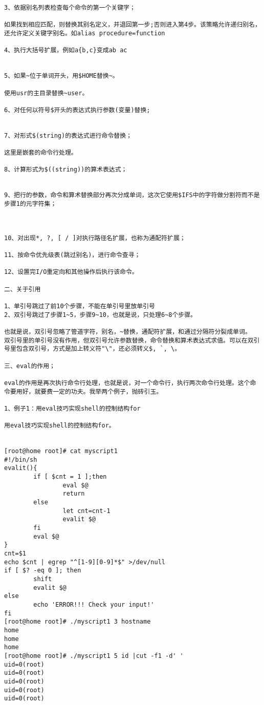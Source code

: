 \begin{lstlisting}
3、依据别名列表检查每个命令的第一个关键字；

如果找到相应匹配，则替换其别名定义，并退回第一步;否则进入第4步。该策略允许递归别名，还允许定义关键字别名。如alias procedure=function

4、执行大括号扩展，例如a{b,c}变成ab ac


5、如果~位于单词开头，用$HOME替换~。

使用usr的主目录替换~user。

6、对任何以符号$开头的表达式执行参数(变量)替换;


7、对形式$(string)的表达式进行命令替换；

这里是嵌套的命令行处理。

8、计算形式为$((string))的算术表达式；


9、把行的参数，命令和算术替换部分再次分成单词，这次它使用$IFS中的字符做分割符而不是步骤1的元字符集；

 

10、对出现*, ?, [ / ]对执行路径名扩展，也称为通配符扩展；

11、按命令优先级表(跳过别名)，进行命令查寻；

12、设置完I/O重定向和其他操作后执行该命令。

二、关于引用

1、单引号跳过了前10个步骤，不能在单引号里放单引号
2、双引号跳过了步骤1~5，步骤9~10，也就是说，只处理6~8个步骤。

也就是说，双引号忽略了管道字符，别名，~替换，通配符扩展，和通过分隔符分裂成单词。
双引号里的单引号没有作用，但双引号允许参数替换，命令替换和算术表达式求值。可以在双引号里包含双引号，方式是加上转义符"\"，还必须转义$, `, \。

三、eval的作用；

eval的作用是再次执行命令行处理，也就是说，对一个命令行，执行两次命令行处理。这个命令要用好，就要费一定的功夫。我举两个例子，抛砖引玉。

1、例子1：用eval技巧实现shell的控制结构for

用eval技巧实现shell的控制结构for。

 
[root@home root]# cat myscript1
#!/bin/sh
evalit(){
        if [ $cnt = 1 ];then
                eval $@
                return
        else
                let cnt=cnt-1
                evalit $@
        fi
        eval $@
}
cnt=$1
echo $cnt | egrep "^[1-9][0-9]*$" >/dev/null
if [ $? -eq 0 ]; then
        shift
        evalit $@
else
        echo 'ERROR!!! Check your input!'
fi
[root@home root]# ./myscript1 3 hostname
home
home
home
[root@home root]# ./myscript1 5 id |cut -f1 -d' '
uid=0(root)
uid=0(root)
uid=0(root)
uid=0(root)
uid=0(root)


\end{lstlisting}
